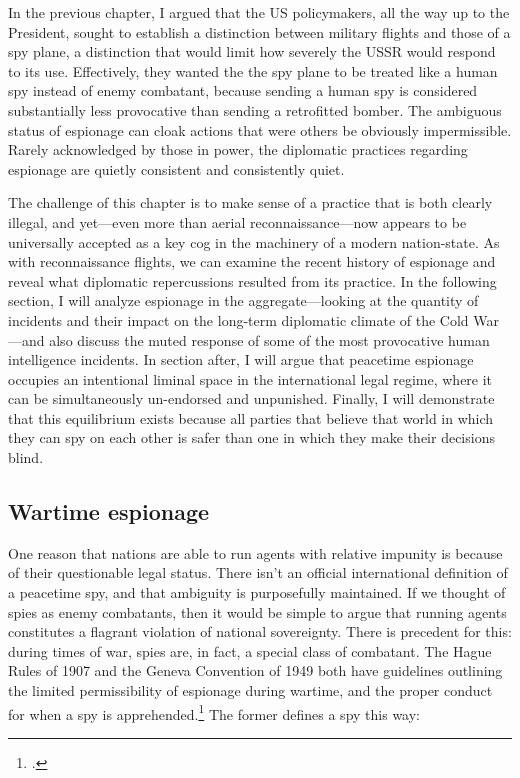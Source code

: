 \documentclass{memoir}
\begin{document}
\begin{refsegment}
In the previous chapter, I argued that the US policymakers, all the way up to the President, sought to establish a distinction between military flights and those of a spy plane, a distinction that would limit how severely the USSR would respond to its use. Effectively, they wanted the the spy plane to be treated like a human spy instead of enemy combatant, because sending a human spy is considered substantially less provocative than sending a retrofitted bomber. The ambiguous status of espionage can cloak actions that were others be obviously impermissible. Rarely acknowledged by those in power, the diplomatic practices regarding espionage are quietly consistent and consistently quiet.

The challenge of this chapter is to make sense of a practice that is both clearly illegal, and yet---even more than aerial reconnaissance---now appears to be universally accepted as a key cog in the machinery of a modern nation-state. As with reconnaissance flights, we can examine the recent history of espionage and reveal what diplomatic repercussions resulted from its practice. In the following section, I will analyze espionage in the aggregate---looking at the quantity of incidents and their impact on the long-term diplomatic climate of the Cold War---and also discuss the muted response of some of the most provocative human intelligence incidents. In section after, I will argue that peacetime espionage occupies an intentional liminal space in the international legal regime, where it can be simultaneously un-endorsed and unpunished. Finally, I will demonstrate that this equilibrium exists because all parties that believe that world in which they can spy on each other is safer than one in which they make their decisions blind.
\subsection{Wartime espionage}
One reason that nations are able to run agents with relative impunity is because of their questionable legal status. There isn't an official international definition of a peacetime spy, and that ambiguity is purposefully maintained. If we thought of spies as enemy combatants, then it would be simple to argue that running agents constitutes a flagrant violation of national sovereignty. There is precedent for this: during times of war, spies are, in fact, a special class of combatant. The Hague Rules of 1907 and the Geneva Convention of 1949 both have guidelines outlining the limited permissibility of espionage during wartime, and the proper conduct for when a spy is apprehended.\footcite[p.~652]{beim_enforcing_2018} The former defines a spy this way:


\end{refsegment}
\end{document}

